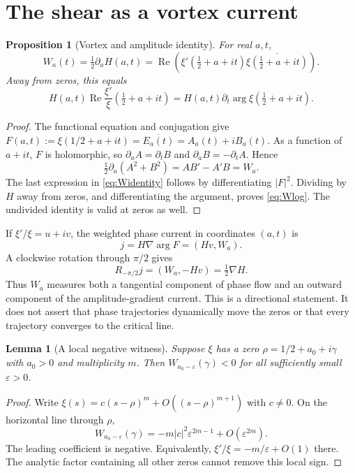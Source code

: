 \documentclass[11pt,letterpaper]{article}
\numberwithin{equation}{section}
\newtheorem{proposition}[theorem]{Proposition}
\newtheorem{lemma}[theorem]{Lemma}
\theoremstyle{definition}
\theoremstyle{remark}
\newcommand{\Repart}{\operatorname{Re}}
\begin{document}
\section{The shear as a vortex current}
\begin{proposition}[Vortex and amplitude identity]\label{prop:vortex}
For real $a,t$,
\begin{equation}\label{eq:Widentity}
W_a(t)=\tfrac12\partial_aH(a,t)
=\Repart\!\left(\xi'(\tfrac12+a+it)\overline{\xi(\tfrac12+a+it)}\right).
\end{equation}
Away from zeros, this equals
\begin{equation}\label{eq:Wlog}
H(a,t)\Repart\frac{\xi'}{\xi}(\tfrac12+a+it)
=H(a,t)\partial_t\arg\xi(\tfrac12+a+it).
\end{equation}
\end{proposition}
\begin{proof}
The functional equation and conjugation give $F(a,t):=\xi(1/2+a+it)=\overline{E_a(t)}=A_a(t)+iB_a(t)$. As a function of $a+it$, $F$ is holomorphic, so $\partial_a A=\partial_t B$ and $\partial_a B=-\partial_t A$. Hence
\[
\tfrac12\partial_a(A^2+B^2)=AB'-A'B=W_a.
\]
The last expression in \eqref{eq:Widentity} follows by differentiating $|F|^2$. Dividing by $H$ away from zeros, and differentiating the argument, proves \eqref{eq:Wlog}. The undivided identity is valid at zeros as well.
\end{proof}

If $\xi'/\xi=u+iv$, the weighted phase current in coordinates $(a,t)$ is
\begin{equation}\label{eq:current}
j=H\nabla\arg F=(Hv,W_a).
\end{equation}
A clockwise rotation through $\pi/2$ gives
\[
R_{-\pi/2}j=(W_a,-Hv)=\tfrac12\nabla H.
\]
Thus $W_a$ measures both a tangential component of phase flow and an outward component of the amplitude-gradient current. This is a directional statement. It does not assert that phase trajectories dynamically move the zeros or that every trajectory converges to the critical line.

\begin{lemma}[A local negative witness]\label{lem:localnegative}
Suppose $\xi$ has a zero $\rho=1/2+a_0+i\gamma$ with $a_0>0$ and multiplicity $m$. Then $W_{a_0-\varepsilon}(\gamma)<0$ for all sufficiently small $\varepsilon>0$.
\end{lemma}
\begin{proof}
Write $\xi(s)=c(s-\rho)^m+O((s-\rho)^{m+1})$ with $c\ne0$. On the horizontal line through $\rho$,
\[
W_{a_0-\varepsilon}(\gamma)
=-m|c|^2\varepsilon^{2m-1}+O(\varepsilon^{2m}).
\]
The leading coefficient is negative. Equivalently, $\xi'/\xi=-m/\varepsilon+O(1)$ there. The analytic factor containing all other zeros cannot remove this local sign.
\end{proof}
\end{document}
